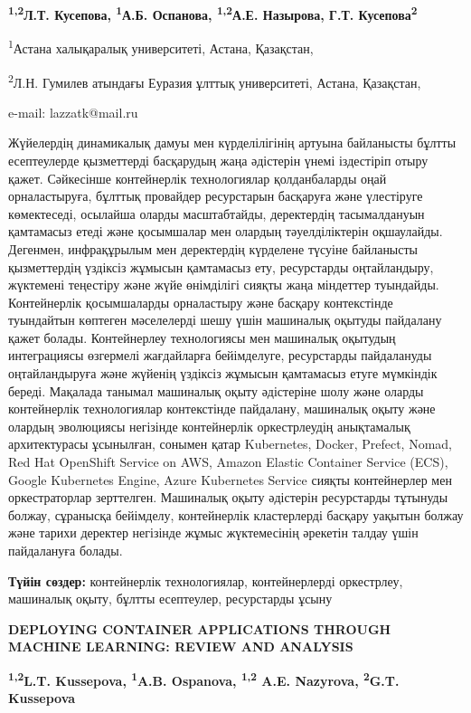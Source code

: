 {\bfseries \textsuperscript{1,2}Л.Т. Кусепова, \textsuperscript{1}А.Б.
Оспанова, \textsuperscript{1,2}А.Е. Назырова, Г.Т.
Кусепова\textsuperscript{2}}

\textsuperscript{1}Астана халықаралық университеті, Астана, Қазақстан,

\textsuperscript{2}Л.Н. Гумилев атындағы Еуразия ұлттық университеті,
Астана, Қазақстан,

e-mail: lazzatk@mail.ru

Жүйелердің динамикалық дамуы мен күрделілігінің артуына байланысты
бұлтты есептеулерде қызметтерді басқарудың жаңа әдістерін үнемі
іздестіріп отыру қажет. Сәйкесінше контейнерлік технологиялар
қолданбаларды оңай орналастыруға, бұлттық провайдер ресурстарын
басқаруға және үлестіруге көмектеседі, осылайша оларды масштабтайды,
деректердің тасымалдануын қамтамасыз етеді және қосымшалар мен олардың
тәуелділіктерін оқшаулайды. Дегенмен, инфрақұрылым мен деректердің
күрделене түсуіне байланысты қызметтердің үздіксіз жұмысын қамтамасыз
ету, ресурстарды оңтайландыру, жүктемені теңестіру және жүйе өнімділігі
сияқты жаңа міндеттер туындайды. Контейнерлік қосымшаларды орналастыру
және басқару контекстінде туындайтын көптеген мәселелерді шешу үшін
машиналық оқытуды пайдалану қажет болады. Контейнерлеу технологиясы мен
машиналық оқытудың интеграциясы өзгермелі жағдайларға бейімделуге,
ресурстарды пайдалануды оңтайландыруға және жүйенің үздіксіз жұмысын
қамтамасыз етуге мүмкіндік береді. Мақалада танымал машиналық оқыту
әдістеріне шолу және оларды контейнерлік технологиялар контекстінде
пайдалану, машиналық оқыту және олардың эволюциясы негізінде
контейнерлік оркестрлеудің анықтамалық архитектурасы ұсынылған, сонымен
қатар Kubernetes, Docker, Prefect, Nomad, Red Hat OpenShift Service on
AWS, Amazon Elastic Container Service (ECS), Google Kubernetes Engine,
Azure Kubernetes Service сияқты контейнерлер мен оркестраторлар
зерттелген. Машиналық оқыту әдістерін ресурстарды тұтынуды болжау,
сұранысқа бейімделу, контейнерлік кластерлерді басқару уақытын болжау
және тарихи деректер негізінде жұмыс жүктемесінің әрекетін талдау үшін
пайдалануға болады.

{\bfseries Түйін сөздер:} контейнерлік технологиялар, контейнерлерді
оркестрлеу, машиналық оқыту, бұлтты есептеулер, ресурстарды ұсыну

{\bfseries DEPLOYING CONTAINER APPLICATIONS THROUGH MACHINE LEARNING:
REVIEW AND ANALYSIS}

{\bfseries \textsuperscript{1,2}L.T. Kussepova, \textsuperscript{1}A.B.
Ospanova, \textsuperscript{1,2} A.E. Nazyrova, \textsuperscript{2}G.T.
Kussepova}

